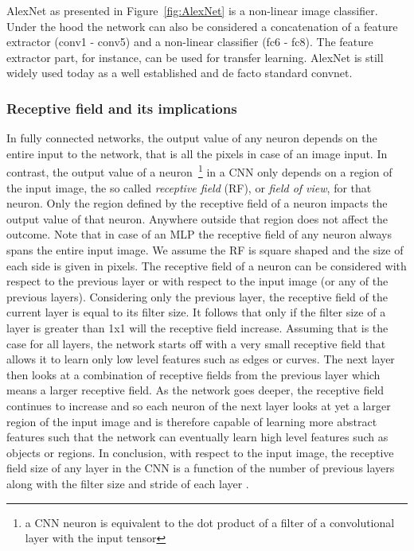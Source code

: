 \documentclass[12pt,a4paper]{article}
\begin{document}
AlexNet as presented in Figure~\ref{fig:AlexNet} is a non-linear image classifier. Under the hood the network can also be considered a concatenation of a feature extractor (conv1 - conv5) and a non-linear classifier (fc6 - fc8). The feature extractor part, for instance, can be used for transfer learning. AlexNet is still widely used today as a well established and de facto standard convnet.

\subsubsection{Receptive field and its implications}\label{sec:rf}
In fully connected networks, the output value of any neuron depends on the entire input to the network, that is all the pixels in case of an image input. In contrast, the output value of a neuron~\footnote{a CNN neuron is equivalent to the dot product of a filter of a convolutional layer with the input tensor} in a CNN only depends on a region of the input image, the so called \textit{receptive field} (RF), or \textit{field of view}, for that neuron. Only the region defined by the receptive field of a neuron impacts the output value of that neuron. Anywhere outside that region does not affect the outcome. Note that in case of an MLP the receptive field of any neuron always spans the entire input image. We assume the RF is square shaped and the size of each side is given in pixels. The receptive field of a neuron can be considered with respect to the previous layer or with respect to the input image (or any of the previous layers). Considering only the previous layer, the receptive field of the current layer is equal to its filter size. It follows that only if the filter size of a layer is greater than 1x1 will the receptive field increase. Assuming that is the case for all layers, the network starts off with a very small receptive field that allows it to learn only low level features such as edges or curves. The next layer then looks at a combination of receptive fields from the previous layer which means a larger receptive field. As the network goes deeper, the receptive field continues to increase and so each neuron of the next layer looks at yet a larger region of the input image and is therefore capable of learning more abstract features such that the network can eventually learn high level features such as objects or regions. In conclusion, with respect to the input image, the receptive field size of any layer in the CNN is a function of the number of previous layers along with the filter size and stride of each layer \cite{li_recept_field_2017}.
\end{document}
